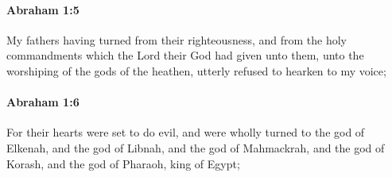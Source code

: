 
		\paragraph{Abraham 1:5} %
			\label{ABRAHAM-1-5}

			My fathers having turned from their righteousness, and from the holy commandments which the Lord their God had given unto them, unto the worshiping of the gods of the heathen, utterly refused to hearken to my voice;


		\paragraph{Abraham 1:6} %
			\label{ABRAHAM-1-6}

			For their hearts were set to do evil, and were wholly turned to the god of Elkenah, and the god of Libnah, and the god of Mahmackrah, and the god of Korash, and the god of Pharaoh, king of Egypt;

